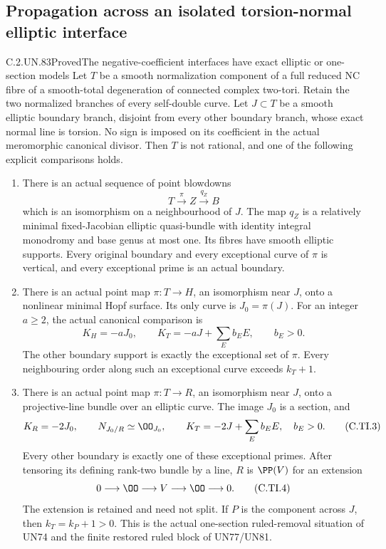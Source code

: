 \subsection{Propagation across an isolated torsion-normal elliptic interface}

\begin{statement}{C.2.UN.83}{Proved}{The negative-coefficient interfaces have exact elliptic or one-section models}
Let \(T\) be a smooth normalization component of a full
reduced NC fibre of a smooth-total degeneration of connected
complex two-tori. Retain the two normalized branches of
every self-double curve. Let \(J\subset T\) be a smooth
elliptic boundary branch, disjoint from every other boundary
branch, whose exact normal line is torsion. No sign is
imposed on its coefficient in the actual meromorphic
canonical divisor. Then \(T\) is not rational, and one
of the following explicit comparisons holds.

\begin{enumerate}
\item There is an actual sequence of point blowdowns
\[
 T\xrightarrow{\pi}Z\xrightarrow{q_Z}B
 \tag{C.TI.1}
\]
which is an isomorphism on a neighbourhood of \(J\).
The map \(q_Z\) is a relatively minimal fixed-Jacobian
elliptic quasi-bundle with identity integral monodromy
and base genus at most one. Its fibres have smooth
elliptic supports. Every original boundary and every
exceptional curve of \(\pi\) is vertical, and every
exceptional prime is an actual boundary.

\item There is an actual point map \(\pi:T\to H\),
an isomorphism near \(J\), onto a nonlinear minimal
Hopf surface. Its only curve is \(J_0=\pi(J)\).
For an integer \(a\ge2\), the actual canonical
comparison is
\[
 K_H=-aJ_0,\qquad
 K_T=-aJ+\sum_E b_EE,\qquad b_E>0.
 \tag{C.TI.2}
\]
The other boundary support is exactly the exceptional
set of \(\pi\). Every neighbouring order along such
an exceptional curve exceeds \(k_T+1\).

\item There is an actual point map \(\pi:T\to R\),
an isomorphism near \(J\), onto a projective-line
bundle over an elliptic curve. The image \(J_0\)
is a section, and
\[
 K_R=-2J_0,\qquad N_{J_0/R}\simeq\OO_{J_0},\qquad
 K_T=-2J+\sum_E b_EE,\quad b_E>0.
 \tag{C.TI.3}
\]
Every other boundary is exactly one of these
exceptional primes. After tensoring its defining
rank-two bundle by a line, \(R\) is
\(\PP(V)\) for an extension
\[
              0\longrightarrow\OO\longrightarrow V
                    \longrightarrow\OO\longrightarrow0.
 \tag{C.TI.4}
\]
The extension is retained and need not split.
If \(P\) is the component across \(J\), then
\(k_T=k_P+1>0\). This is the actual one-section
ruled-removal situation of UN74 and the finite
restored ruled block of UN77/UN81.
\end{enumerate}


\end{statement}
